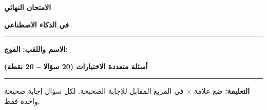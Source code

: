 \documentclass[a4paper]{article}
\newif\ifcorrection
\begin{document}
\begin{center}

{\Large\khatt\textbf{الامتحان النهائي}\ifcorrection\ \textbf{-- التصحيح النموذجي}\fi}

\vspace{0.2cm}

{\Large\khatt\textbf{في الذكاء الاصطناعي}}

\end{center}

\rule{\textwidth}{1pt}

\ifcorrection\else
\textbf{الاسم واللقب:} \dotfill \quad \textbf{الفوج:} \makebox[3cm]{\dotfill}

\vspace{0.3cm}
\fi

\begin{center}

{\khatt\textbf{أسئلة متعددة الاختيارات (20 سؤالا -- 20 نقطة)}}

\end{center}

\rule{\textwidth}{1pt}

\textbf{التعليمة:} ضع علامة \textbf{$\times$} في المربع المقابل للإجابة الصحيحة. لكل سؤال إجابة صحيحة واحدة فقط.

\vspace{0.3cm}
\end{document}
